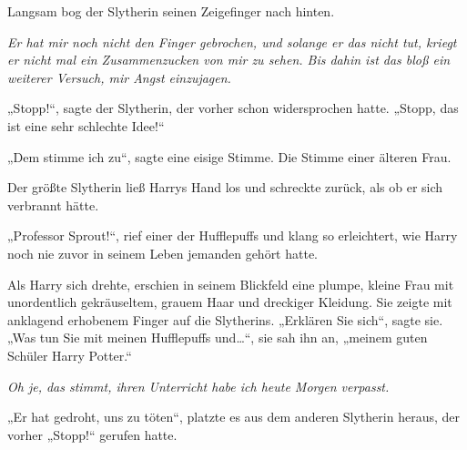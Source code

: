 Langsam bog der Slytherin seinen Zeigefinger nach hinten.

\emph{Er hat mir noch nicht den Finger gebrochen, und solange er das nicht tut, kriegt er nicht mal ein Zusammenzucken von mir zu sehen. Bis dahin ist das bloß ein weiterer Versuch, mir Angst einzujagen.}

„Stopp!“, sagte der Slytherin, der vorher schon widersprochen hatte. „Stopp, das ist eine sehr schlechte Idee!“

„Dem stimme ich zu“, sagte eine eisige Stimme. Die Stimme einer älteren Frau.

Der größte Slytherin ließ Harrys Hand los und schreckte zurück, als ob er sich verbrannt hätte.

„Professor Sprout!“, rief einer der Hufflepuffs und klang so erleichtert, wie Harry noch nie zuvor in seinem Leben jemanden gehört hatte.

Als Harry sich drehte, erschien in seinem Blickfeld eine plumpe, kleine Frau mit unordentlich gekräuseltem, grauem Haar und dreckiger Kleidung. Sie zeigte mit anklagend erhobenem Finger auf die Slytherins. „Erklären Sie sich“, sagte sie. „Was tun Sie mit meinen Hufflepuffs und…“, sie sah ihn an, „meinem guten Schüler Harry Potter.“

\emph{Oh je, das stimmt, \emph{ihren} Unterricht habe ich heute Morgen verpasst.}

„Er hat gedroht, uns zu töten“, platzte es aus dem anderen Slytherin heraus, der vorher „Stopp!“ gerufen hatte.

